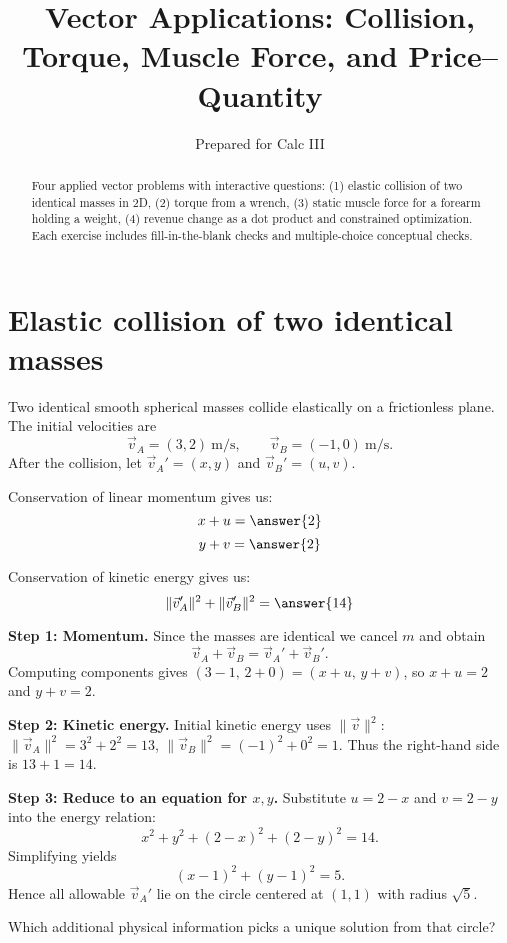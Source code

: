 \documentclass{ximera}
\title{Vector Applications: Collision, Torque, Muscle Force, and Price--Quantity}
\author{Prepared for Calc III}
\begin{document}
\begin{abstract}
Four applied vector problems with interactive questions: (1) elastic collision of two identical masses in 2D, (2) torque from a wrench, (3) static muscle force for a forearm holding a weight, (4) revenue change as a dot product and constrained optimization. Each exercise includes fill-in-the-blank checks and multiple-choice conceptual checks.
\end{abstract}

\maketitle

\section*{Elastic collision of two identical masses}

\begin{problem}
Two identical smooth spherical masses collide elastically on a frictionless plane. The initial velocities are
\[
\vec v_A=(3,2)\ \text{m/s}, \qquad \vec v_B=(-1,0)\ \text{m/s}.
\]
After the collision, let \(\vec v_A'=(x,y)\) and \(\vec v_B'=(u,v)\).

Conservation of linear momentum gives us:
\[
x+u=\answer{2}
\]
\[
y+v=\answer{2}
\]

Conservation of kinetic energy gives us:
\[
\|\vec v_A'\|^2 + \|\vec v_B'\|^2 = \answer{14}
\]
\end{problem}

\begin{solution}
\textbf{Step 1: Momentum.} Since the masses are identical we cancel \(m\) and obtain
\[
\vec v_A+\vec v_B = \vec v_A' + \vec v_B'.
\]
Computing components gives \( (3-1,\,2+0)=(x+u,\,y+v)\), so \(x+u=2\) and \(y+v=2\).

\textbf{Step 2: Kinetic energy.} Initial kinetic energy uses \(\|\vec v\|^2\): \(\|\vec v_A\|^2 = 3^2+2^2 =13\), \(\|\vec v_B\|^2 = (-1)^2 + 0^2 = 1\). Thus the right-hand side is \(13+1=14\).

\textbf{Step 3: Reduce to an equation for \(x,y\).} Substitute \(u=2-x\) and \(v=2-y\) into the energy relation:
\[
x^2+y^2 + (2-x)^2+(2-y)^2 = 14.
\]
Simplifying yields
\[
(x-1)^2 + (y-1)^2 = 5.
\]
Hence all allowable \(\vec v_A'\) lie on the circle centered at \((1,1)\) with radius \(\sqrt{5}\).

Which additional physical information picks a unique solution from that circle?
\begin{multipleChoice}
\end{multipleChoice}
\end{solution}
\end{document}
